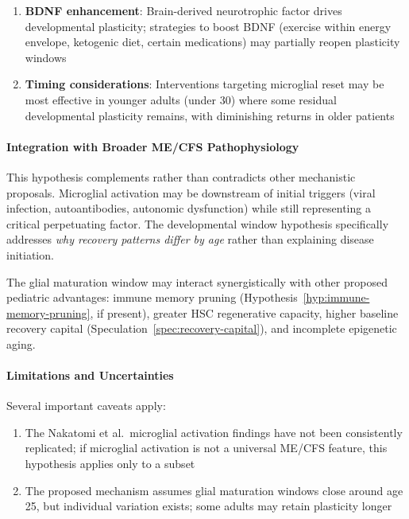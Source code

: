 \begin{hypothesis}
\begin{enumerate}
    \item \textbf{BDNF enhancement}: Brain-derived neurotrophic factor drives developmental plasticity; strategies to boost BDNF (exercise within energy envelope, ketogenic diet, certain medications) may partially reopen plasticity windows

    \item \textbf{Timing considerations}: Interventions targeting microglial reset may be most effective in younger adults (under 30) where some residual developmental plasticity remains, with diminishing returns in older patients
\end{enumerate}

\paragraph{Integration with Broader ME/CFS Pathophysiology}

This hypothesis complements rather than contradicts other mechanistic proposals. Microglial activation may be downstream of initial triggers (viral infection, autoantibodies, autonomic dysfunction) while still representing a critical perpetuating factor. The developmental window hypothesis specifically addresses \emph{why recovery patterns differ by age} rather than explaining disease initiation.

The glial maturation window may interact synergistically with other proposed pediatric advantages: immune memory pruning (Hypothesis~\ref{hyp:immune-memory-pruning}, if present), greater HSC regenerative capacity, higher baseline recovery capital (Speculation~\ref{spec:recovery-capital}), and incomplete epigenetic aging.

\paragraph{Limitations and Uncertainties}

Several important caveats apply:

\begin{enumerate}
    \item The Nakatomi et al.\ microglial activation findings have not been consistently replicated; if microglial activation is not a universal ME/CFS feature, this hypothesis applies only to a subset

    \item The proposed mechanism assumes glial maturation windows close around age 25, but individual variation exists; some adults may retain plasticity longer


\end{enumerate}
\end{hypothesis}
